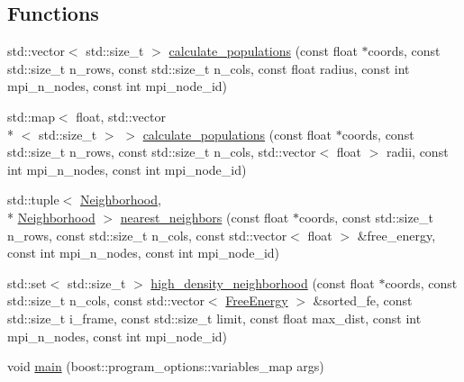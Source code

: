 \subsection*{Functions}
\begin{DoxyCompactItemize}
\item 
std\-::vector$<$ std\-::size\-\_\-t $>$ \hyperlink{namespaceClustering_1_1Density_1_1MPI_a49411f6868731f415fc9f4df88a93f85}{calculate\-\_\-populations} (const float $\ast$coords, const std\-::size\-\_\-t n\-\_\-rows, const std\-::size\-\_\-t n\-\_\-cols, const float radius, const int mpi\-\_\-n\-\_\-nodes, const int mpi\-\_\-node\-\_\-id)
\item 
std\-::map$<$ float, std\-::vector\\*
$<$ std\-::size\-\_\-t $>$ $>$ \hyperlink{namespaceClustering_1_1Density_1_1MPI_a26f0389754b56b3ab9cba8b1e104eea4}{calculate\-\_\-populations} (const float $\ast$coords, const std\-::size\-\_\-t n\-\_\-rows, const std\-::size\-\_\-t n\-\_\-cols, std\-::vector$<$ float $>$ radii, const int mpi\-\_\-n\-\_\-nodes, const int mpi\-\_\-node\-\_\-id)
\item 
std\-::tuple$<$ \hyperlink{namespaceClustering_1_1Density_a23a99ccebc9d9cf5c9df6af14559d539}{Neighborhood}, \\*
\hyperlink{namespaceClustering_1_1Density_a23a99ccebc9d9cf5c9df6af14559d539}{Neighborhood} $>$ \hyperlink{namespaceClustering_1_1Density_1_1MPI_a96e8c2094ad93897c31ba99c1834558f}{nearest\-\_\-neighbors} (const float $\ast$coords, const std\-::size\-\_\-t n\-\_\-rows, const std\-::size\-\_\-t n\-\_\-cols, const std\-::vector$<$ float $>$ \&free\-\_\-energy, const int mpi\-\_\-n\-\_\-nodes, const int mpi\-\_\-node\-\_\-id)
\item 
std\-::set$<$ std\-::size\-\_\-t $>$ \hyperlink{namespaceClustering_1_1Density_1_1MPI_a5c65622ccb0ac27b493afb7a87d08e29}{high\-\_\-density\-\_\-neighborhood} (const float $\ast$coords, const std\-::size\-\_\-t n\-\_\-cols, const std\-::vector$<$ \hyperlink{namespaceClustering_1_1Density_af77cfa169766fdc136b680121101496d}{Free\-Energy} $>$ \&sorted\-\_\-fe, const std\-::size\-\_\-t i\-\_\-frame, const std\-::size\-\_\-t limit, const float max\-\_\-dist, const int mpi\-\_\-n\-\_\-nodes, const int mpi\-\_\-node\-\_\-id)
\item 
void \hyperlink{namespaceClustering_1_1Density_1_1MPI_a90f5cd06769c3bdac5360fd9441f2008}{main} (boost\-::program\-\_\-options\-::variables\-\_\-map args)
\end{DoxyCompactItemize}
